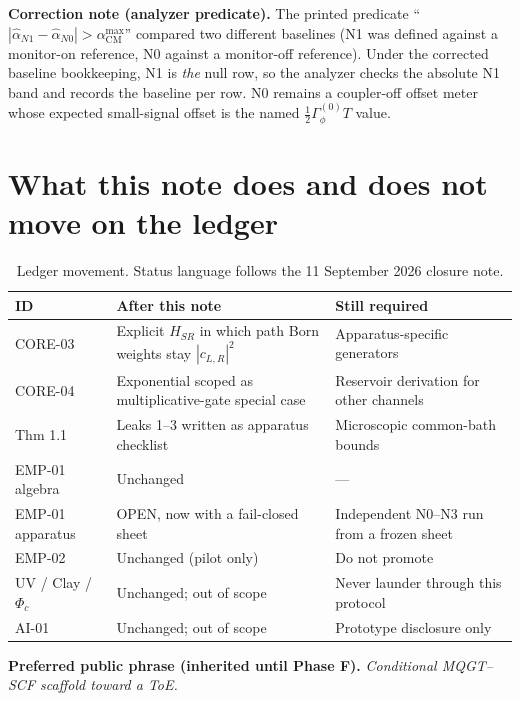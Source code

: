 \documentclass[11pt]{article}
\newenvironment{correction}{%
  \par\medskip
  \begin{lrbox}{\corrsave}%
  \begin{minipage}{\dimexpr\linewidth-2\fboxsep}%
    \small
}{%
  \end{minipage}%
  \end{lrbox}%
  \noindent\fcolorbox{corrrule}{corrback}{\usebox\corrsave}%
  \par\medskip
}
\theoremstyle{definition}
\theoremstyle{plain}
\begin{document}
\begin{correction}
\noindent\textbf{Correction note (analyzer predicate).} The printed predicate ``$|\hat\alpha_{N1} -
\hat\alpha_{N0}| > \alpha_{\mathrm{CM}}^{\max}$'' compared two different baselines (N1 was defined against a
monitor-on reference, N0 against a monitor-off reference). Under the corrected baseline bookkeeping,
N1 is \emph{the} null row, so the analyzer checks the absolute N1 band and records the baseline per row.
N0 remains a coupler-off offset meter whose expected small-signal offset is the named
$\tfrac12\Gamma_\phi^{(0)}T$ value.
\end{correction}

\section{What this note does and does not move on the ledger}

\begin{table}[h]
\centering
\small
\caption{Ledger movement. Status language follows the 11 September 2026 closure note.\cite{status}}
\label{tab:ledger}
\begin{tabular}{p{1.3in}p{2.6in}p{3.3in}}
\hline
\textbf{ID} & \textbf{After this note} & \textbf{Still required}\\\hline
CORE-03 & Explicit $H_{SR}$ in which path Born weights stay $|c_{L,R}|^2$ & Apparatus-specific generators\\
CORE-04 & Exponential scoped as multiplicative-gate special case & Reservoir derivation for other channels\\
Thm 1.1 & Leaks 1--3 written as apparatus checklist & Microscopic common-bath bounds\\
EMP-01 algebra & Unchanged & ---\\
EMP-01 apparatus & OPEN, now with a fail-closed sheet & Independent N0--N3 run from a frozen sheet\\
EMP-02 & Unchanged (pilot only) & Do not promote\\
UV / Clay / $\Phi_c$ & Unchanged; out of scope & Never launder through this protocol\\
AI-01 & Unchanged; out of scope & Prototype disclosure only\\
\hline
\end{tabular}
\end{table}

\textbf{Preferred public phrase (inherited until Phase F).} \emph{Conditional MQGT--SCF scaffold
toward a ToE.}
\end{document}
